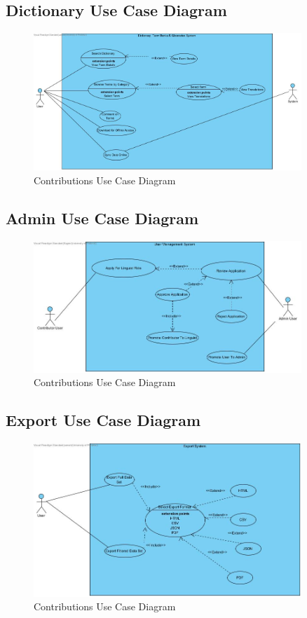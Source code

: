 \documentclass[12pt]{article}
\begin{document}
\subsection{Dictionary Use Case Diagram}
\begin{figure}[H]
  \centering
  \includegraphics[width=0.9\textwidth]{Dictionary,Glossaies and Term Banl.jpg}
  \caption{Contributions Use Case Diagram}
  \label{fig:contributions-use-case}
\end{figure}

\subsection{Admin Use Case Diagram}
\begin{figure}[H]
  \centering
  \includegraphics[width=0.9\textwidth]{Admin-User-Management.jpg}
  \caption{Contributions Use Case Diagram}
  \label{fig:contributions-use-case}
\end{figure}

\subsection{Export Use Case Diagram}
\begin{figure}[H]
  \centering
  \includegraphics[width=0.9\textwidth]{Export System.jpg}
  \caption{Contributions Use Case Diagram}
  \label{fig:contributions-use-case}
\end{figure}
\end{document}

